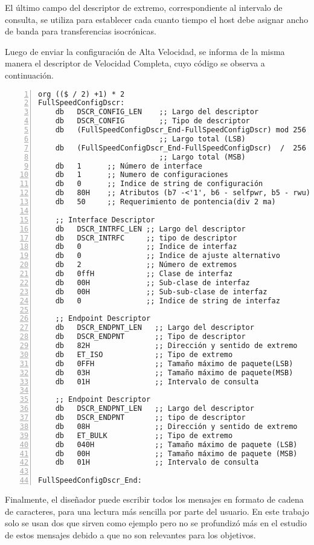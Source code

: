 	El último campo del descriptor de extremo, correspondiente al intervalo de consulta, se utiliza para establecer cada cuanto tiempo el host debe asignar ancho de banda para transferencias isocrónicas.
	
	Luego de enviar la configuración de Alta Velocidad, se informa de la misma manera el descriptor de Velocidad Completa, cuyo código se observa a continuación.
	
	\begin{lstlisting}[language={[x86masm]Assembler},backgroundcolor=\color{gray!30},numbers=left]
org (($ / 2) +1) * 2
FullSpeedConfigDscr:
	db   DSCR_CONFIG_LEN	;; Largo del descriptor
	db   DSCR_CONFIG        ;; Tipo de descriptor
	db   (FullSpeedConfigDscr_End-FullSpeedConfigDscr) mod 256
							;; Largo total (LSB)
	db   (FullSpeedConfigDscr_End-FullSpeedConfigDscr)  /  256 
							;; Largo total (MSB)
	db   1      ;; Número de interface
	db   1      ;; Numero de configuraciones
	db   0      ;; Indice de string de configuración
	db   80H    ;; Atributos (b7 -<'1', b6 - selfpwr, b5 - rwu)
	db   50     ;; Requerimiento de pontencia(div 2 ma)
	
	;; Interface Descriptor
	db   DSCR_INTRFC_LEN ;; Largo del descriptor
	db   DSCR_INTRFC     ;; tipo de descriptor
	db   0               ;; Indice de interfaz
	db   0               ;; Indice de ajuste alternativo
	db   2               ;; Número de extremos
	db   0ffH            ;; Clase de interfaz
	db   00H             ;; Sub-clase de interfaz
	db   00H             ;; Sub-sub-clase de interfaz
	db   0               ;; Indice de string de interfaz
	
	;; Endpoint Descriptor
	db   DSCR_ENDPNT_LEN   ;; Largo del descriptor
	db   DSCR_ENDPNT       ;; Tipo de descriptor
	db   82H               ;; Dirección y sentido de extremo
	db   ET_ISO            ;; Tipo de extremo
	db   0FFH              ;; Tamaño máximo de paquete(LSB)
	db   03H               ;; Tamaño máximo de paquete(MSB)
	db   01H               ;; Intervalo de consulta
	
	;; Endpoint Descriptor
	db   DSCR_ENDPNT_LEN   ;; Largo del descriptor
	db   DSCR_ENDPNT       ;; tipo de descriptor
	db   08H               ;; Dirección y sentido de extremo
	db   ET_BULK           ;; Tipo de extremo
	db   040H              ;; Tamaño máximo de paquete (LSB)
	db   00H               ;; Tamaño máximo de paquete (MSB)
	db   01H               ;; Intervalo de consulta
	
FullSpeedConfigDscr_End:
	\end{lstlisting}

	Finalmente, el diseñador puede escribir todos los mensajes en formato de cadena de caracteres, para una lectura más sencilla por parte del usuario. En este trabajo solo se usan dos que sirven como ejemplo pero no se profundizó más en el estudio de estos mensajes debido a que no son relevantes para los objetivos.
	
	
	
%	
